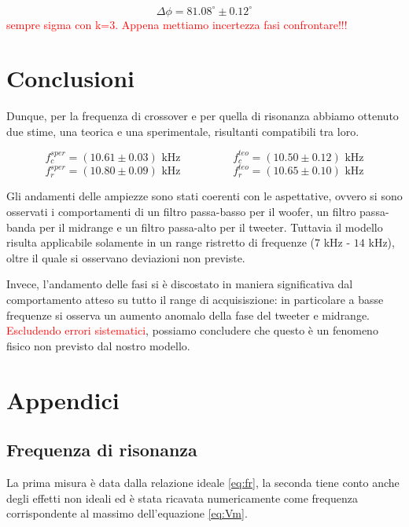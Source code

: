 \documentclass[12pt,italian]{article}
\newcommand{\err}[1]{\textcolor{red}{#1}}
\begin{document}
\begin{equation*}
	\Delta \phi = 81.08^\circ \pm 0.12^\circ
\end{equation*}
\err{sempre sigma con k=3. Appena mettiamo incertezza fasi confrontare!!!}

\section*{Conclusioni}

Dunque, per la frequenza di crossover e per quella di risonanza abbiamo
ottenuto due stime, una teorica e una sperimentale, risultanti compatibili tra
loro.

\begin{equation*}
	f_{c}^{sper} = (10.61 \pm 0.03) \text{ kHz} \hspace{2cm}
	f_{c}^{teo} = (10.50 \pm 0.12) \text{ kHz}
\end{equation*}
\begin{equation*}
	f_{r}^{sper} = (10.80 \pm 0.09) \text{ kHz}
	\hspace{2cm} f_{r}^{teo} = (10.65 \pm 0.10) \text{ kHz}
\end{equation*}

Gli andamenti delle ampiezze sono stati coerenti con le aspettative, ovvero si
sono osservati i comportamenti di un filtro passa-basso per il woofer, un
filtro passa-banda per il midrange e un filtro passa-alto per il tweeter.
Tuttavia il modello risulta applicabile solamente in un range ristretto di
frequenze ($7$ kHz - $14$ kHz), oltre il quale si osservano deviazioni non
previste.

Invece, l'andamento delle fasi si è discostato in maniera significativa dal
comportamento atteso su tutto il range di acquisiszione: in particolare a basse
frequenze si osserva un aumento anomalo della fase del tweeter e midrange.
\err{Escludendo errori sistematici}, possiamo concludere che questo è un
fenomeno fisico non previsto dal nostro modello.

\appendix
\section{Appendici}
\subsection{Frequenza di risonanza}\label{sec:resFreq}
La prima misura è data dalla relazione ideale \eqref{eq:fr}, la seconda tiene
conto anche degli effetti non ideali ed è stata ricavata numericamente come
frequenza corrispondente al massimo dell'equazione \eqref{eq:Vm}.
\end{document}
